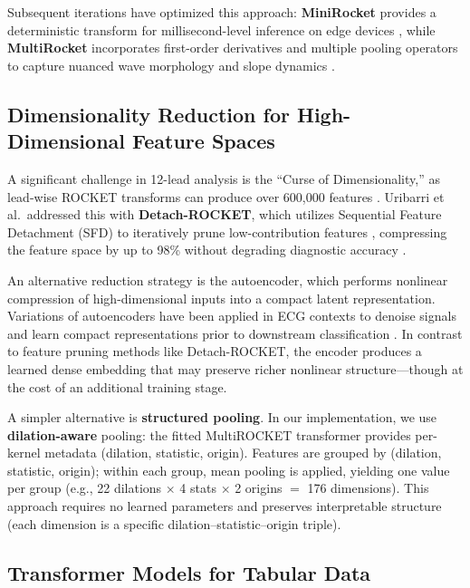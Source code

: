 \documentclass[10pt,twocolumn,letterpaper]{article}
\begin{document}
Subsequent iterations have optimized this approach: \textbf{MiniRocket} provides a deterministic transform for millisecond-level inference on edge devices \cite{dempster2021}, while \textbf{MultiRocket} incorporates first-order derivatives and multiple pooling operators to capture nuanced wave morphology and slope dynamics \cite{tan2022, wang2023}.

\subsection{Dimensionality Reduction for High-Dimensional Feature Spaces}

A significant challenge in 12-lead analysis is the ``Curse of Dimensionality,'' as lead-wise ROCKET transforms can produce over 600,000 features \cite{researchgate_block}. Uribarri et al.\ addressed this with \textbf{Detach-ROCKET}, which utilizes Sequential Feature Detachment (SFD) to iteratively prune low-contribution features \cite{uribarri2023}, compressing the feature space by up to 98\% without degrading diagnostic accuracy \cite{upcommons_rocket}.

An alternative reduction strategy is the autoencoder, which performs nonlinear compression of high-dimensional inputs into a compact latent representation. Variations of autoencoders have been applied in ECG contexts to denoise signals \cite{nurmaini_deep_2020, xia_denoising_2023} and learn compact representations prior to downstream classification \cite{c_harvey_ecg_2025, g_wang_unsupervised_2023}. In contrast to feature pruning methods like Detach-ROCKET, the encoder produces a learned dense embedding that may preserve richer nonlinear structure—though at the cost of an additional training stage.

A simpler alternative is \textbf{structured pooling}. In our implementation, we use \textbf{dilation-aware} pooling: the fitted MultiROCKET transformer provides per-kernel metadata (dilation, statistic, origin). Features are grouped by (dilation, statistic, origin); within each group, mean pooling is applied, yielding one value per group (e.g., 22 dilations $\times$ 4 stats $\times$ 2 origins $=$ 176 dimensions). This approach requires no learned parameters and preserves interpretable structure (each dimension is a specific dilation--statistic--origin triple).

\subsection{Transformer Models for Tabular Data}
\end{document}
